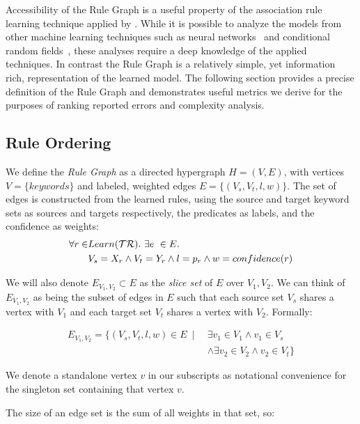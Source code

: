 Accessibility of the Rule Graph is a useful property of the association 
rule learning technique applied by \app.
While it is possible to analyze the models from other machine learning techniques such as neural networks~\cite{lei2016rationalizing} and
conditional random fields~\cite{raychev2015predicting}, these analyses require a deep knowledge of the applied techniques.
In contrast the Rule Graph is a relatively simple, yet information rich, representation of the learned model.
The following section provides a precise definition of the Rule Graph
and demonstrates useful metrics we derive for the purposes of ranking reported errors
and complexity analysis.

\subsection{Rule Ordering}
\label{sec:ruleorder}

We define the \textit{Rule Graph} as a directed hypergraph $H = (V,E)$,
   with vertices $V = \{ keywords \}$ and labeled, weighted edges $E = \{ (V_s, V_t, l, w) \}$.
The set of edges is constructed from the learned rules, using the source and target keyword sets as sources and targets respectively, the predicates as labels, and the confidence as weights:
%
\begin{align*}
\forall r \in & Learn(\mathcal{TR}).\ \exists e\ \in E.\\
              & V_s = X_r \land V_t=Y_r \land l=p_r \land w = confidence(r)
\end{align*}

We will also denote $E_{V_1, V_2} \subset E$ as the \textit{slice set} 
of $E$ over $V_1, V_2$.
We can think of $E_{V_1, V_2}$ as being the subset of edges in $E$ 
such that each source set $V_s$ shares a vertex with $V_1$
and each target set $V_t$ shares a vertex with $V_2$.
Formally: 

\begin{align*}
    E_{V_1, V_2} = \{ \left( V_s, V_t, l, w \right) \in E \ \mid \ & \exists v_1 \in V_1 \land v_1 \in V_s \\
    & \land \exists v_2 \in V_2 \land v_2 \in V_t \}
\end{align*}


We denote a standalone vertex $v$ in our subscripts as notational 
convenience for the singleton set containing that vertex $v$.

The size of an edge set is the sum of all weights in that set, so:

